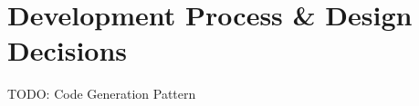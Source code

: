 
\chapter{Development Process \& Design Decisions}

\label{ch:development}

TODO: Code Generation Pattern
